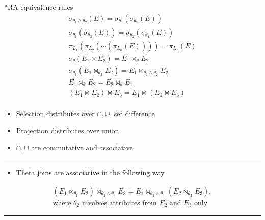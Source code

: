 \documentclass[a4paper]{article}
\makeatletter
\renewcommand{\subsection}{
  \@startsection{subsection}{2}{0pt}{1ex}{0.8ex} {\raggedleft\normalfont\normalsize\bfseries\fbox}}
\makeatother
\begin{document}
\begin{multicols*}{3}
  \subsection*{RA equivalence rules} \noindent
    \begin{gather*}
      \sigma_{\theta_1 \land \theta_2} (E) = \sigma_{\theta_1} ( \sigma_{\theta_2}(E) ) \\
      \sigma_{\theta_1} ( \sigma_{\theta_2}(E) ) = \sigma_{\theta_2} ( \sigma_{\theta_1}(E) ) \\
      \pi_{L_1} ( \pi_{L_2} ( \cdots ( \pi_{L_n} (E) ))) = \pi_{L_1} (E) \\
      \sigma_\theta (E_1 \times E_2) = E_1 \Join_\theta E_2 \\
      \sigma_{\theta_1} (E_1 \Join_{\theta_2} E_2) = E_1 \Join_{\theta_1 \land \theta_2} E_2 \\
      E_1 \Join_\theta E_2 = E_2 \Join_\theta E_1 \\
      (E_1 \Join E_2) \Join E_3 = E_1 \Join (E_2 \Join E_3) \\
    \end{gather*}
    \vspace{-0.8cm}
    \begin{itemize}[leftmargin=*]
      \item Selection distributes over $\cap, \cup$, set difference
      \item Projection distributes over union
      \item $\cap, \cup$ are commutative and associative
    \end{itemize}
    \hrule \hfill
    \begin{itemize}[leftmargin=*]
      \item Theta joins are associative in the following way
    \end{itemize}
    \begin{gather*}
      (E_1 \Join_{\theta_1} E_2) \Join_{\theta_2 \land \theta_3} E_3 = E_1 \Join_{\theta_1 \land \theta_3} (E_2 \Join_{\theta_2} E_3), \\
      \text{where } \theta_2 \text{ involves attributes from } E_2 \text{ and } E_3 \text{ only}
    \end{gather*}
    \hrule
    \vspace{-0.3cm}
    \begin{center}

\end{center}
\end{multicols*}
\end{document}
